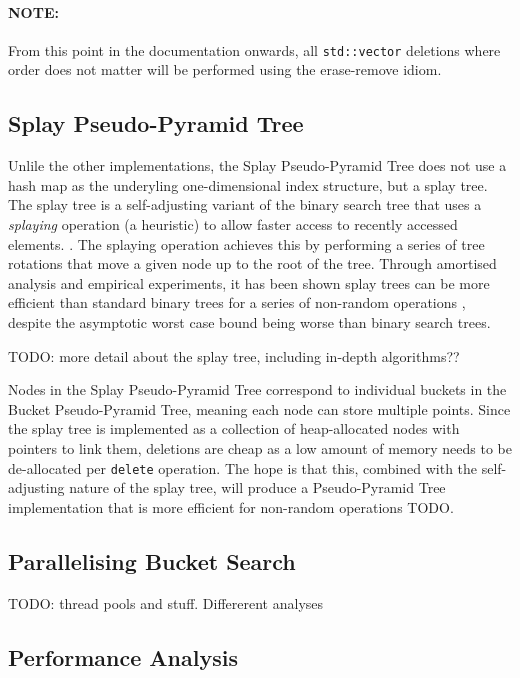 \paragraph{\textbf{NOTE: }} From this point in the documentation onwards, all \texttt{std::vector} deletions where order does not matter will be performed using the erase-remove idiom.

\subsection{Splay Pseudo-Pyramid Tree}

Unlile the other implementations, the Splay Pseudo-Pyramid Tree does not use a hash map as the underyling one-dimensional index structure, but a splay tree. The splay tree is a self-adjusting variant of the binary search tree that uses a \textit{splaying} operation (a heuristic) to allow faster access to recently accessed elements. \cite{splay-tree}. The splaying operation achieves this by performing a series of tree rotations that move a given node up to the root of the tree. Through amortised analysis and empirical experiments, it has been shown splay trees can be more efficient than standard binary trees for a series of non-random operations \cite{splay-tree}, despite the asymptotic worst case bound being worse than binary search trees.

TODO: more detail about the splay tree, including in-depth algorithms??

Nodes in the Splay Pseudo-Pyramid Tree correspond to individual buckets in the Bucket Pseudo-Pyramid Tree, meaning each node can store multiple points. Since the splay tree is implemented as a collection of heap-allocated nodes with pointers to link them, deletions are cheap as a low amount of memory needs to be de-allocated per \texttt{delete} operation. The hope is that this, combined with the self-adjusting nature of the splay tree, will produce a Pseudo-Pyramid Tree implementation that is more efficient for non-random operations TODO.

\subsection{Parallelising Bucket Search}

TODO: thread pools and stuff. Differerent analyses

\subsection{Performance Analysis}

